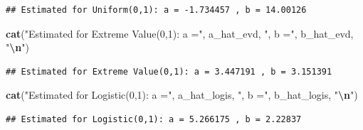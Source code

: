 \documentclass[
]{article}
\newenvironment{Shaded}{\begin{snugshade}}{\end{snugshade}}
\newcommand{\FunctionTok}[1]{\textcolor[rgb]{0.13,0.29,0.53}{\textbf{#1}}}
\newcommand{\NormalTok}[1]{#1}
\newcommand{\SpecialCharTok}[1]{\textcolor[rgb]{0.81,0.36,0.00}{\textbf{#1}}}
\newcommand{\StringTok}[1]{\textcolor[rgb]{0.31,0.60,0.02}{#1}}
\begin{document}
\begin{verbatim}
## Estimated for Uniform(0,1): a = -1.734457 , b = 14.00126
\end{verbatim}

\begin{Shaded}
\begin{Highlighting}[]
\FunctionTok{cat}\NormalTok{(}\StringTok{"Estimated for Extreme Value(0,1): a ="}\NormalTok{, a\_hat\_evd, }\StringTok{", b ="}\NormalTok{, b\_hat\_evd, }\StringTok{"}\SpecialCharTok{\textbackslash{}n}\StringTok{"}\NormalTok{)}
\end{Highlighting}
\end{Shaded}

\begin{verbatim}
## Estimated for Extreme Value(0,1): a = 3.447191 , b = 3.151391
\end{verbatim}

\begin{Shaded}
\begin{Highlighting}[]
\FunctionTok{cat}\NormalTok{(}\StringTok{"Estimated for Logistic(0,1): a ="}\NormalTok{, a\_hat\_logis, }\StringTok{", b ="}\NormalTok{, b\_hat\_logis, }\StringTok{"}\SpecialCharTok{\textbackslash{}n}\StringTok{"}\NormalTok{)}
\end{Highlighting}
\end{Shaded}

\begin{verbatim}
## Estimated for Logistic(0,1): a = 5.266175 , b = 2.22837
\end{verbatim}
\end{document}
